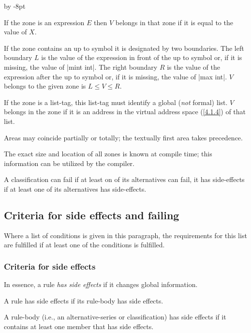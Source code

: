\documentclass{article}
\newcommand\g[1]{{\sf #1}}
\renewenvironment{itemize}{\begin{list}{}{%
\advance\leftmargin by -8pt%
\setlength\itemsep{0ex plus 0.2ex}%
\setlength\partopsep{3pt}%
\setlength\topsep{2pt plus 2pt}%
\setlength\parsep{0pt plus 2pt}%
}}{\end{list}}
\begin{document}
\begin{itemize}\item[$\cdot$]
If the \g{zone} is an \g{expression} $E$ then $V$ belongs in that \g{zone} if
it is equal to the value of $X$.
\item[$\cdot$]
If the \g{zone} contains an \g{up to symbol} it is designated by two
boundaries. The left boundary $L$ is the value of the \g{expression} in
front of the \g{up to symbol} or, if it is missing, the value of \pp|mint
int|. The right boundary $R$ is the value of the \g{expression} after the
\g{up to symbol} or, if it is missing, the value of \pp|max int|. $V$
belongs to the given \g{zone} is $L\le V\le R$.
\item[$\cdot$]
If the \g{zone} is a \g{list-tag}, this \g{list-tag} must identify a global
(\emph{not} formal) list. $V$ belongs in the \g{zone} if it is an
address in the virtual address space (\ref{4.1.4}) of that list.
\end{itemize}
\g{Area}s may coincide partially or totally; the textually first \g{area}
takes precedence.

The exact size and location of all \g{zone}s is known at compile time; this
information can be utilized by the compiler.

A \g{classification} can fail if at least on of its \g{alternative}s can
fail, it has side-effects if at least one of its \g{alternative}s has
side-effects.

\subsection{Criteria for side effects and failing}\label{3.9}

Where a list of conditions is given in this paragraph, the requirements for
this list are fulfilled if at least one of the conditions is fulfilled.

\subsubsection{Criteria for side effects}\label{3.9.1}
In essence, a rule \emph{has side effects} if it changes global
information.

A rule has side effects if its \g{rule-body} has side effects.

A \g{rule-body} (i.e., an \g{alternative-series} or \g{classification}) has
side effects if it contains at least one \g{member} that has side effects.
\end{document}
